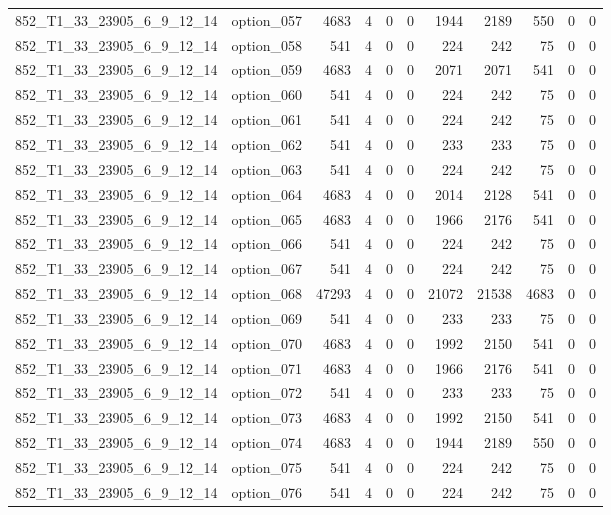 \begin{tabular}{llrrrrrrrrr}
852\_T1\_33\_23905\_6\_9\_12\_14 & option\_057 & 4683 & 4 & 0 & 0 & 1944 & 2189 & 550 & 0 & 0 \\
852\_T1\_33\_23905\_6\_9\_12\_14 & option\_058 & 541 & 4 & 0 & 0 & 224 & 242 & 75 & 0 & 0 \\
852\_T1\_33\_23905\_6\_9\_12\_14 & option\_059 & 4683 & 4 & 0 & 0 & 2071 & 2071 & 541 & 0 & 0 \\
852\_T1\_33\_23905\_6\_9\_12\_14 & option\_060 & 541 & 4 & 0 & 0 & 224 & 242 & 75 & 0 & 0 \\
852\_T1\_33\_23905\_6\_9\_12\_14 & option\_061 & 541 & 4 & 0 & 0 & 224 & 242 & 75 & 0 & 0 \\
852\_T1\_33\_23905\_6\_9\_12\_14 & option\_062 & 541 & 4 & 0 & 0 & 233 & 233 & 75 & 0 & 0 \\
852\_T1\_33\_23905\_6\_9\_12\_14 & option\_063 & 541 & 4 & 0 & 0 & 224 & 242 & 75 & 0 & 0 \\
852\_T1\_33\_23905\_6\_9\_12\_14 & option\_064 & 4683 & 4 & 0 & 0 & 2014 & 2128 & 541 & 0 & 0 \\
852\_T1\_33\_23905\_6\_9\_12\_14 & option\_065 & 4683 & 4 & 0 & 0 & 1966 & 2176 & 541 & 0 & 0 \\
852\_T1\_33\_23905\_6\_9\_12\_14 & option\_066 & 541 & 4 & 0 & 0 & 224 & 242 & 75 & 0 & 0 \\
852\_T1\_33\_23905\_6\_9\_12\_14 & option\_067 & 541 & 4 & 0 & 0 & 224 & 242 & 75 & 0 & 0 \\
852\_T1\_33\_23905\_6\_9\_12\_14 & option\_068 & 47293 & 4 & 0 & 0 & 21072 & 21538 & 4683 & 0 & 0 \\
852\_T1\_33\_23905\_6\_9\_12\_14 & option\_069 & 541 & 4 & 0 & 0 & 233 & 233 & 75 & 0 & 0 \\
852\_T1\_33\_23905\_6\_9\_12\_14 & option\_070 & 4683 & 4 & 0 & 0 & 1992 & 2150 & 541 & 0 & 0 \\
852\_T1\_33\_23905\_6\_9\_12\_14 & option\_071 & 4683 & 4 & 0 & 0 & 1966 & 2176 & 541 & 0 & 0 \\
852\_T1\_33\_23905\_6\_9\_12\_14 & option\_072 & 541 & 4 & 0 & 0 & 233 & 233 & 75 & 0 & 0 \\
852\_T1\_33\_23905\_6\_9\_12\_14 & option\_073 & 4683 & 4 & 0 & 0 & 1992 & 2150 & 541 & 0 & 0 \\
852\_T1\_33\_23905\_6\_9\_12\_14 & option\_074 & 4683 & 4 & 0 & 0 & 1944 & 2189 & 550 & 0 & 0 \\
852\_T1\_33\_23905\_6\_9\_12\_14 & option\_075 & 541 & 4 & 0 & 0 & 224 & 242 & 75 & 0 & 0 \\
852\_T1\_33\_23905\_6\_9\_12\_14 & option\_076 & 541 & 4 & 0 & 0 & 224 & 242 & 75 & 0 & 0 \\

\end{tabular}
